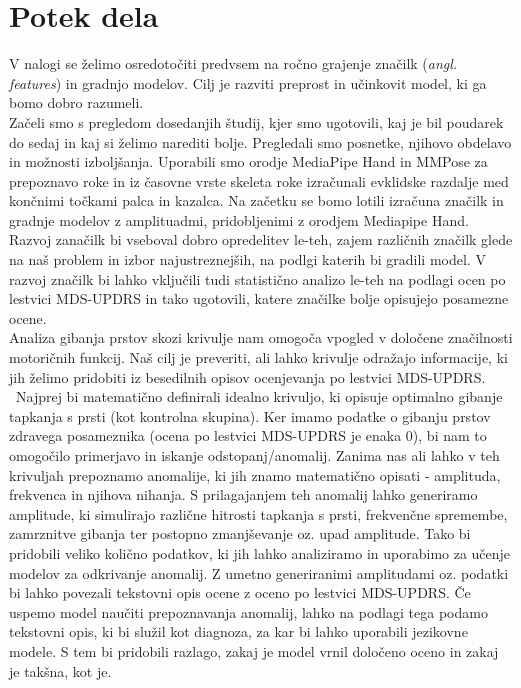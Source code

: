 \documentclass[a4paper,12pt]{article}
\begin{document}
\section{Potek dela}
V nalogi se želimo osredotočiti predvsem na ročno grajenje značilk (\textit{angl. features}) 
in gradnjo modelov. Cilj je razviti preprost in učinkovit model, ki ga bomo dobro razumeli. \\

Začeli smo s pregledom dosedanjih študij, kjer smo ugotovili, kaj je bil poudarek do sedaj in kaj si želimo 
narediti bolje. Pregledali smo posnetke, njihovo obdelavo in možnosti izboljšanja. Uporabili smo
orodje MediaPipe Hand in MMPose za prepoznavo roke in iz časovne vrste skeleta roke izračunali evklidske 
razdalje med končnimi točkami palca in kazalca. Na začetku se bomo lotili izračuna značilk in gradnje 
modelov z amplituadmi, pridobljenimi z orodjem Mediapipe Hand. \\

Razvoj zanačilk bi vseboval dobro opredelitev le-teh, zajem različnih značilk glede na naš problem in 
izbor najustreznejših, na podlgi katerih bi gradili model. V razvoj značilk bi lahko vključili tudi statistično 
analizo le-teh na podlagi ocen po lestvici MDS-UPDRS in tako ugotovili, katere značilke bolje opisujejo 
posamezne ocene. \\

Analiza gibanja prstov skozi krivulje nam omogoča vpogled v določene značilnosti motoričnih funkcij. Naš 
cilj je preveriti, ali lahko krivulje odražajo informacije, ki jih želimo pridobiti iz besedilnih opisov 
ocenjevanja po lestvici MDS-UPDRS. \
Najprej bi matematično definirali idealno krivuljo, ki opisuje optimalno gibanje tapkanja s prsti (kot kontrolna 
skupina). Ker imamo podatke o gibanju prstov zdravega posameznika (ocena po lestvici MDS-UPDRS je enaka 0), 
bi nam to omogočilo primerjavo in iskanje odstopanj/anomalij. Zanima nas ali lahko v teh krivuljah prepoznamo 
anomalije, ki jih znamo matematično opisati - amplituda, frekvenca in njihova nihanja. S prilagajanjem teh 
anomalij lahko generiramo amplitude, ki simulirajo različne hitrosti tapkanja s prsti, frekvenčne spremembe, zamrznitve gibanja 
ter postopno zmanjševanje oz. upad amplitude. Tako bi pridobili veliko količno podatkov, ki jih lahko 
analiziramo in uporabimo za učenje modelov za odkrivanje anomalij. Z umetno generiranimi amplitudami oz. podatki bi 
lahko povezali tekstovni opis ocene z oceno po lestvici MDS-UPDRS. Če uspemo model naučiti prepoznavanja 
anomalij, lahko na podlagi tega podamo tekstovni opis, ki bi služil kot diagnoza, za kar bi lahko uporabili jezikovne modele. S tem bi pridobili 
razlago, zakaj je model vrnil določeno oceno in zakaj je takšna, kot je. \\
\end{document}
